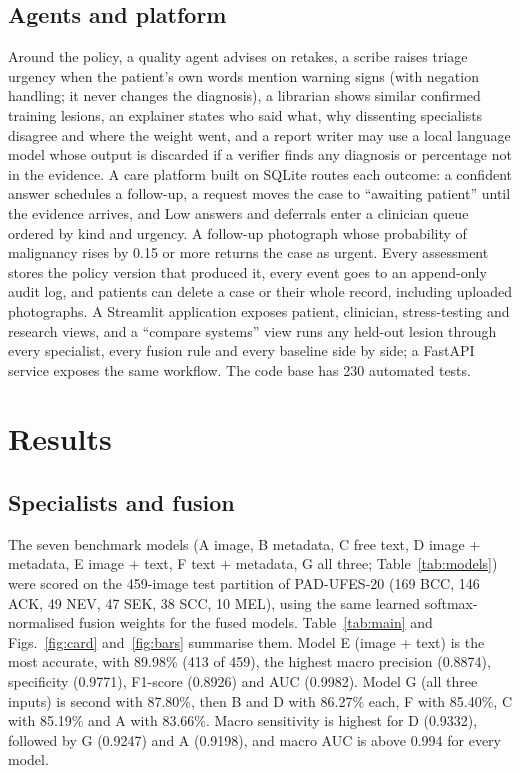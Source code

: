 \documentclass[conference]{IEEEtran}
\begin{document}
\subsection{Agents and platform}
Around the policy, a quality agent advises on retakes, a scribe raises triage urgency when the patient's own words mention warning signs (with negation handling; it never changes the diagnosis), a librarian shows similar confirmed training lesions, an explainer states who said what, why dissenting specialists disagree and where the weight went, and a report writer may use a local language model whose output is discarded if a verifier finds any diagnosis or percentage not in the evidence. A care platform built on SQLite routes each outcome: a confident answer schedules a follow-up, a request moves the case to ``awaiting patient'' until the evidence arrives, and Low answers and deferrals enter a clinician queue ordered by kind and urgency. A follow-up photograph whose probability of malignancy rises by 0.15 or more returns the case as urgent. Every assessment stores the policy version that produced it, every event goes to an append-only audit log, and patients can delete a case or their whole record, including uploaded photographs. A Streamlit application exposes patient, clinician, stress-testing and research views, and a ``compare systems'' view runs any held-out lesion through every specialist, every fusion rule and every baseline side by side; a FastAPI service exposes the same workflow. The code base has 230 automated tests.

\section{Results}
\subsection{Specialists and fusion}
The seven benchmark models (A image, B metadata, C free text, D image + metadata, E image + text, F text + metadata, G all three; Table~\ref{tab:models}) were scored on the 459-image test partition of PAD-UFES-20 (169 BCC, 146 ACK, 49 NEV, 47 SEK, 38 SCC, 10 MEL), using the same learned softmax-normalised fusion weights for the fused models. Table~\ref{tab:main} and Figs.~\ref{fig:card} and~\ref{fig:bars} summarise them. Model E (image + text) is the most accurate, with 89.98\% (413 of 459), the highest macro precision (0.8874), specificity (0.9771), F1-score (0.8926) and AUC (0.9982). Model G (all three inputs) is second with 87.80\%, then B and D with 86.27\% each, F with 85.40\%, C with 85.19\% and A with 83.66\%. Macro sensitivity is highest for D (0.9332), followed by G (0.9247) and A (0.9198), and macro AUC is above 0.994 for every model.
\end{document}
